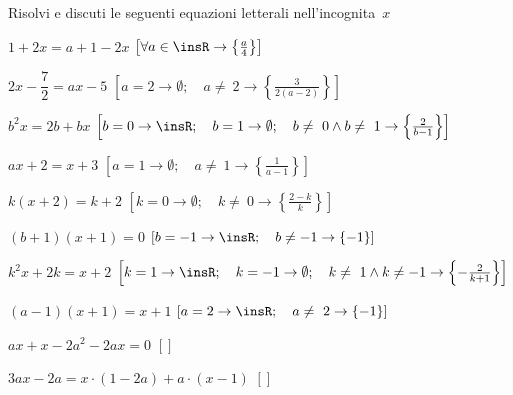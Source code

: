 \subsubsection*{}

\begin{esercizio}[\Ast]
\label{ese:20.34}
Risolvi e discuti le seguenti equazioni letterali nell'incognita~$x$
\begin{enumeratea}
 \item $1+2x=a+1-2x$
\hfill $\left[\forall a\in \insR \rightarrow \left\{\frac{a}{4}\right\}\right]$
 \item $2x-\dfrac{7}{2}=ax-5$
\hfill $\left[a=2 \rightarrow \emptyset; \quad a \neq~2 \rightarrow 
              \left\{\frac{3}{2(a-2)}\right\}\right]$
 \item $b^{2}x=2b+bx$
\hfill $\left[b=0 \rightarrow \insR; \quad 
              b=1\rightarrow\emptyset; \quad 
              b\neq~0\wedge b\neq~1\rightarrow \left\{\frac{2}{b-1}\right\}
        \right]$
 \item $ax+2=x+3$
\hfill $\left[a=1\rightarrow \emptyset; \quad 
              a\neq~1\rightarrow \left\{\frac{1}{a-1}\right\}\right]$
 \item $k(x+2)=k+2$
\hfill $\left[k=0 \rightarrow \emptyset; \quad k\neq~0 \rightarrow 
\left\{\frac{2-k}{k}\right\}\right]$
 \item $(b+1)(x+1)=0$
\hfill $\left[b=-1 \rightarrow \insR; \quad b\neq -1 \rightarrow 
\left\{-1\right\}\right]$
 \item $k^{2}x+2k=x+2$
\hfill $\left[k=1 \rightarrow \insR; \quad k=-1 \rightarrow 
\emptyset; \quad k\neq~1\wedge k\neq -1 \rightarrow 
\left\{-{\frac{2}{k+1}}\right\}\right]$
 \item $(a-1)(x+1)=x+1$
\hfill $\left[a=2 \rightarrow \insR; \quad a\neq~2 \rightarrow 
\left\{-1\right\}\right]$
 \item $ax+x-2a^{2}-2ax=0$
  \hfill $\left[\right]$
 \item $3ax-2a=x\cdot (1-2a)+a\cdot (x-1)$
  \hfill $\left[\right]$

\end{enumeratea}
\end{esercizio}
